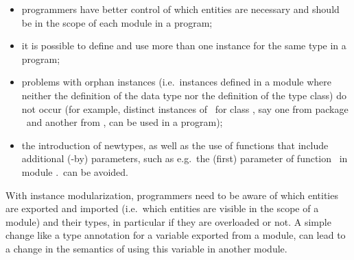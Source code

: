 \begin{itemize}

  \item programmers have better control of which entities are
    necessary and should be in the scope of each module in a program;

  \item it is possible to define and use more than one instance for
    the same type in a program;

  \item problems with orphan instances (i.e.~instances defined in a
    module where neither the definition of the data type nor the
    definition of the type class) do not occur (for example, distinct
    instances of \Either\ for class \Monad, say one from package
    \mtl\ and another from \transformers, can be used in a program);

  \item the introduction of newtypes, as well as the use of functions
    that include additional (-by) parameters, such as e.g.~the (first)
    parameter of function \sortBy\ in module \Data.\List\ can be
    avoided.

\end{itemize}

With instance modularization, programmers need to be aware of which
entities are exported and imported (i.e.~which entities are visible in
the scope of a module) and their types, in particular if they are
overloaded or not.  A simple change like a type annotation for a
variable exported from a module, can lead to a change in the semantics
of using this variable in another module.







